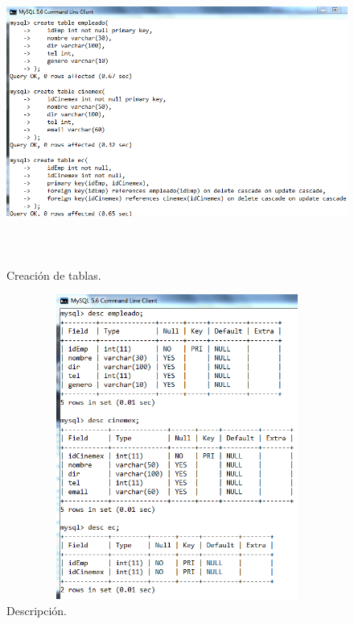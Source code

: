 \documentclass[12pt, titlepage]{article}
\begin{document}
        \begin{figure}[H]
            \begin{center}
                \includegraphics[width=16cm, height=10cm]{img/tablas.png}
                \caption{Creación de tablas.}
                \label{fig:tablas}
            \end{center}
        \end{figure}
    \begin{figure}[H]
        \begin{center}
            \includegraphics[width=12cm, height=10cm]{img/tablas-desc.png}
            \caption{Descripción.}
            \label{fig:desc}
        \end{center}
    \end{figure}
\end{document}
